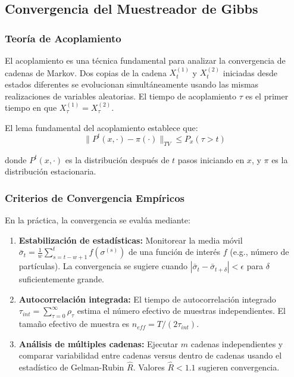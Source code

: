 \subsection{Convergencia del Muestreador de Gibbs}

\subsubsection{Teoría de Acoplamiento}

El acoplamiento es una técnica fundamental para analizar la convergencia de cadenas de Markov. Dos copias de la cadena $X^{(1)}_t$ y $X^{(2)}_t$ iniciadas desde estados diferentes se evolucionan simultáneamente usando las mismas realizaciones de variables aleatorias. El tiempo de acoplamiento $\tau$ es el primer tiempo en que $X^{(1)}_\tau = X^{(2)}_\tau$.

El lema fundamental del acoplamiento establece que:
\begin{equation}
\|P^t(x, \cdot) - \pi(\cdot)\|_{TV} \leq P_x(\tau > t)
\end{equation}

donde $P^t(x, \cdot)$ es la distribución después de $t$ pasos iniciando en $x$, y $\pi$ es la distribución estacionaria.

\subsubsection{Criterios de Convergencia Empíricos}

En la práctica, la convergencia se evalúa mediante:

\begin{enumerate}
\item \textbf{Estabilización de estadísticas:} Monitorear la media móvil $\bar{\sigma}_t = \frac{1}{w}\sum_{s=t-w+1}^{t} f(\sigma^{(s)})$ de una función de interés $f$ (e.g., número de partículas). La convergencia se sugiere cuando $|\bar{\sigma}_t - \bar{\sigma}_{t+\delta}| < \epsilon$ para $\delta$ suficientemente grande.

\item \textbf{Autocorrelación integrada:} El tiempo de autocorrelación integrado $\tau_{int} = \sum_{\tau=0}^{\infty} \rho_\tau$ estima el número efectivo de muestras independientes. El tamaño efectivo de muestra es $n_{eff} = T / (2\tau_{int})$.

\item \textbf{Análisis de múltiples cadenas:} Ejecutar $m$ cadenas independientes y comparar variabilidad entre cadenas versus dentro de cadenas usando el estadístico de Gelman-Rubin $\hat{R}$. Valores $\hat{R} < 1.1$ sugieren convergencia.
\end{enumerate}

